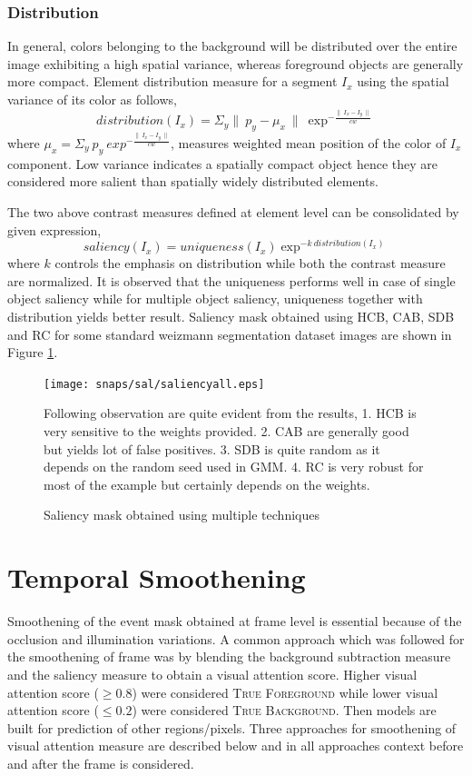 \subsubsection{Distribution}
In general, colors belonging to the background will be distributed over the entire image exhibiting a high spatial variance, whereas foreground objects are generally more compact. Element distribution measure for a segment $I_{x}$ using the spatial variance of its color as follows,
$$distribution(I_{x}) = \Sigma_{y} \parallel~p_{y} -\mu_{x}~\parallel~\exp^{-\frac{\parallel~I_{x} - I_{y}~\parallel}{cw}}$$ 
where $\mu_{x} = \Sigma_{y}~p_{y}~exp^{-\frac{\parallel~I_{x} - I_{y}~\parallel}{cw}}$, measures weighted mean position of the color of $I_{x}$ component. Low variance indicates a spatially compact object hence they are considered more salient than spatially widely distributed elements.

\par The two above contrast measures defined at element level can be consolidated by given expression,
$$saliency(I_{x}) = uniqueness(I_{x}) \exp^{-k~distribution(I_{x})}$$
where $k$ controls the emphasis on distribution while both the contrast measure are normalized. It is observed that the uniqueness performs well in case of single object saliency while for multiple object saliency, uniqueness together with distribution yields better result. Saliency mask obtained using HCB, CAB, SDB and RC for some standard weizmann segmentation dataset images are shown in Figure \ref{fig:sal}. 

\begin{figure}[htpb]
   \begin{center}
	    \texttt{[image: snaps/sal/saliencyall.eps]}     
     \caption {Saliency mask obtained using multiple techniques}
     \medskip \small 
     Following observation are quite evident from the results, 1. HCB is very sensitive to the weights provided. 2. CAB are generally good but yields lot of false positives. 3. SDB is quite random as it depends on the random seed used in GMM. 4. RC is very robust for most of the example but certainly depends on the weights.
   \label{fig:sal}
   \end{center}
 \end{figure}

 \section{Temporal Smoothening}
  \label{sec:ts}
Smoothening of the event mask obtained at frame level is essential because of the occlusion and illumination variations. A common approach which was followed for the smoothening of frame was by blending the background subtraction measure and the saliency measure to obtain a visual attention score. Higher visual attention score ($\geqslant0.8$) were considered \textsc{True Foreground} while lower visual attention score ($\leqslant0.2$)  were considered \textsc{True Background}.  Then models are built for prediction of other regions/pixels.  Three approaches for smoothening of visual attention measure are described below and in all approaches context before and after the frame is considered.

